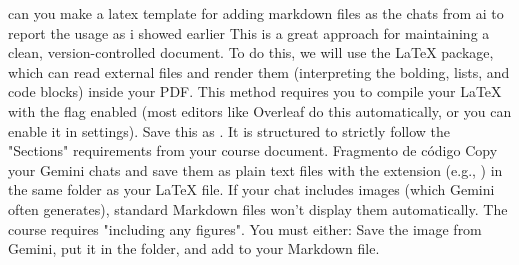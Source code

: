 \markdownRendererOlEnd \markdownRendererInterblockSeparator
{}\markdownRendererThematicBreak{}\markdownRendererInterblockSeparator
{}
\markdownRendererSectionEnd 
\markdownRendererSectionEnd \markdownRendererSectionBegin
{}\markdownRendererInterblockSeparator
{}can you make a latex template for adding markdown files as the chats from ai to report the usage as i showed earlier\markdownRendererInterblockSeparator
{}
\markdownRendererSectionEnd \markdownRendererSectionBegin
{}\markdownRendererInterblockSeparator
{}This is a great approach for maintaining a clean, version-controlled document. To do this, we will use the  LaTeX package, which can read external  files and render them (interpreting the bolding, lists, and code blocks) inside your PDF.\markdownRendererInterblockSeparator
{} This method requires you to compile your LaTeX with the  flag enabled (most editors like Overleaf do this automatically, or you can enable it in settings).\markdownRendererInterblockSeparator
{}\markdownRendererSectionBegin
{}\markdownRendererInterblockSeparator
{}Save this as . It is structured to strictly follow the "Sections" requirements from your course document.\markdownRendererInterblockSeparator
{}Fragmento de código\markdownRendererInterblockSeparator
{}\markdownRendererInterblockSeparator
{}
\markdownRendererSectionEnd \markdownRendererSectionBegin
{}\markdownRendererInterblockSeparator
{}\markdownRendererOlBegin
{} Copy your Gemini chats and save them as plain text files with the  extension (e.g., ) in the same folder as your LaTeX file.\markdownRendererOlItemEnd 
{} If your chat includes images (which Gemini often generates), standard Markdown files won't display them automatically. The course requires "including any figures". You must either:\markdownRendererInterblockSeparator
{}\markdownRendererUlBegin
\markdownRendererUlItem Save the image from Gemini, put it in the folder, and add  to your Markdown file.\markdownRendererUlItemEnd 
